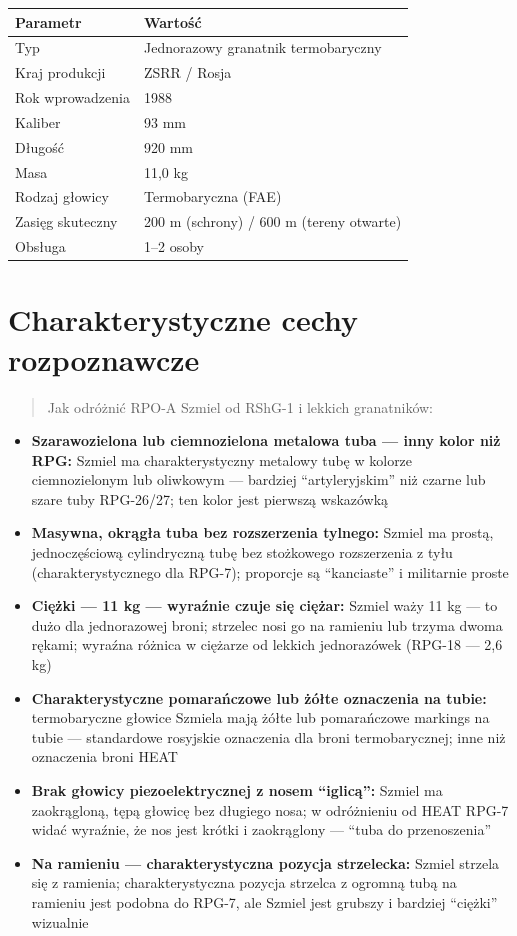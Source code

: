 \documentclass[12pt,openany,oneside]{book}
\providecommand{\tightlist}{%
  \setlength{\itemsep}{0pt}\setlength{\parskip}{0pt}}
\begin{document}
\begin{longtable}[]{@{}ll@{}}
\toprule\noalign{}
Parametr & Wartość \\
\midrule\noalign{}
\endhead
\bottomrule\noalign{}
\endlastfoot
Typ & Jednorazowy granatnik termobaryczny \\
Kraj produkcji & ZSRR / Rosja \\
Rok wprowadzenia & 1988 \\
Kaliber & 93 mm \\
Długość & 920 mm \\
Masa & 11,0 kg \\
Rodzaj głowicy & Termobaryczna (FAE) \\
Zasięg skuteczny & 200 m (schrony) / 600 m (tereny otwarte) \\
Obsługa & 1--2 osoby \\
\end{longtable}

\section{Charakterystyczne cechy
rozpoznawcze}\label{charakterystyczne-cechy-rozpoznawcze-77}

\begin{quote}
Jak odróżnić RPO-A Szmiel od RShG-1 i lekkich granatników:
\end{quote}

\begin{itemize}
\tightlist
\item
  \textbf{Szarawozielona lub ciemnozielona metalowa tuba --- inny kolor
  niż RPG:} Szmiel ma charakterystyczny metalowy tubę w kolorze
  ciemnozielonym lub oliwkowym --- bardziej ``artyleryjskim'' niż czarne
  lub szare tuby RPG-26/27; ten kolor jest pierwszą wskazówką
\item
  \textbf{Masywna, okrągła tuba bez rozszerzenia tylnego:} Szmiel ma
  prostą, jednoczęściową cylindryczną tubę bez stożkowego rozszerzenia z
  tyłu (charakterystycznego dla RPG-7); proporcje są ``kanciaste'' i
  militarnie proste
\item
  \textbf{Ciężki --- 11 kg --- wyraźnie czuje się ciężar:} Szmiel waży
  11 kg --- to dużo dla jednorazowej broni; strzelec nosi go na ramieniu
  lub trzyma dwoma rękami; wyraźna różnica w ciężarze od lekkich
  jednorazówek (RPG-18 --- 2,6 kg)
\item
  \textbf{Charakterystyczne pomarańczowe lub żółte oznaczenia na tubie:}
  termobaryczne głowice Szmiela mają żółte lub pomarańczowe markings na
  tubie --- standardowe rosyjskie oznaczenia dla broni termobarycznej;
  inne niż oznaczenia broni HEAT
\item
  \textbf{Brak głowicy piezoelektrycznej z nosem ``iglicą'':} Szmiel ma
  zaokrągloną, tępą głowicę bez długiego nosa; w odróżnieniu od HEAT
  RPG-7 widać wyraźnie, że nos jest krótki i zaokrąglony --- ``tuba do
  przenoszenia''
\item
  \textbf{Na ramieniu --- charakterystyczna pozycja strzelecka:} Szmiel
  strzela się z ramienia; charakterystyczna pozycja strzelca z ogromną
  tubą na ramieniu jest podobna do RPG-7, ale Szmiel jest grubszy i
  bardziej ``ciężki'' wizualnie
\end{itemize}
\end{document}
